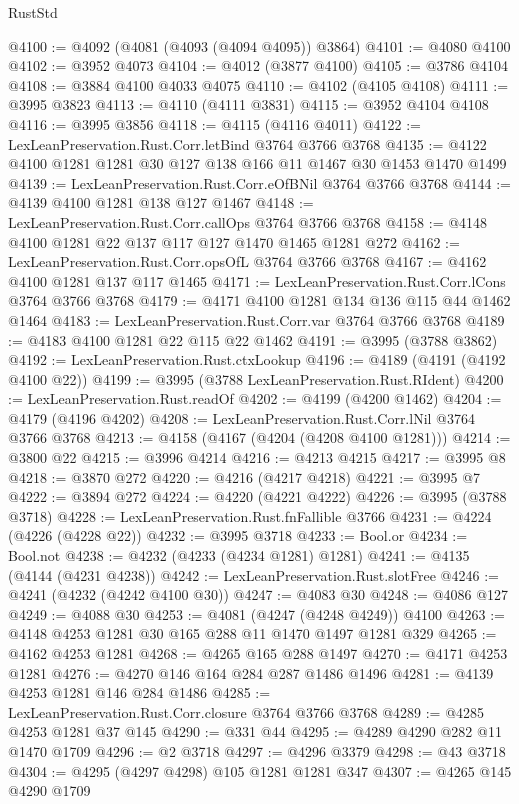 \begin{lexlean}{RustStd}
\begin{coremodule}
@4100 := @4092 (@4081 (@4093 (@4094 @4095)) @3864)
@4101 := @4080 @4100
@4102 := @3952 @4073
@4104 := @4012 (@3877 @4100)
@4105 := @3786 @4104
@4108 := @3884 @4100 @4033 @4075
@4110 := @4102 (@4105 @4108)
@4111 := @3995 @3823
@4113 := @4110 (@4111 @3831)
@4115 := @3952 @4104 @4108
@4116 := @3995 @3856
@4118 := @4115 (@4116 @4011)
@4122 := LexLeanPreservation.Rust.Corr.letBind @3764 @3766 @3768
@4135 := @4122 @4100 @1281 @1281 @30 @127 @138 @166 @11 @1467 @30 @1453 @1470 @1499
@4139 := LexLeanPreservation.Rust.Corr.eOfBNil @3764 @3766 @3768
@4144 := @4139 @4100 @1281 @138 @127 @1467
@4148 := LexLeanPreservation.Rust.Corr.callOps @3764 @3766 @3768
@4158 := @4148 @4100 @1281 @22 @137 @117 @127 @1470 @1465 @1281 @272
@4162 := LexLeanPreservation.Rust.Corr.opsOfL @3764 @3766 @3768
@4167 := @4162 @4100 @1281 @137 @117 @1465
@4171 := LexLeanPreservation.Rust.Corr.lCons @3764 @3766 @3768
@4179 := @4171 @4100 @1281 @134 @136 @115 @44 @1462 @1464
@4183 := LexLeanPreservation.Rust.Corr.var @3764 @3766 @3768
@4189 := @4183 @4100 @1281 @22 @115 @22 @1462
@4191 := @3995 (@3788 @3862)
@4192 := LexLeanPreservation.Rust.ctxLookup
@4196 := @4189 (@4191 (@4192 @4100 @22))
@4199 := @3995 (@3788 LexLeanPreservation.Rust.RIdent)
@4200 := LexLeanPreservation.Rust.readOf
@4202 := @4199 (@4200 @1462)
@4204 := @4179 (@4196 @4202)
@4208 := LexLeanPreservation.Rust.Corr.lNil @3764 @3766 @3768
@4213 := @4158 (@4167 (@4204 (@4208 @4100 @1281)))
@4214 := @3800 @22
@4215 := @3996 @4214
@4216 := @4213 @4215
@4217 := @3995 @8
@4218 := @3870 @272
@4220 := @4216 (@4217 @4218)
@4221 := @3995 @7
@4222 := @3894 @272
@4224 := @4220 (@4221 @4222)
@4226 := @3995 (@3788 @3718)
@4228 := LexLeanPreservation.Rust.fnFallible @3766
@4231 := @4224 (@4226 (@4228 @22))
@4232 := @3995 @3718
@4233 := Bool.or
@4234 := Bool.not
@4238 := @4232 (@4233 (@4234 @1281) @1281)
@4241 := @4135 (@4144 (@4231 @4238))
@4242 := LexLeanPreservation.Rust.slotFree
@4246 := @4241 (@4232 (@4242 @4100 @30))
@4247 := @4083 @30
@4248 := @4086 @127
@4249 := @4088 @30
@4253 := @4081 (@4247 (@4248 @4249)) @4100
@4263 := @4148 @4253 @1281 @30 @165 @288 @11 @1470 @1497 @1281 @329
@4265 := @4162 @4253 @1281
@4268 := @4265 @165 @288 @1497
@4270 := @4171 @4253 @1281
@4276 := @4270 @146 @164 @284 @287 @1486 @1496
@4281 := @4139 @4253 @1281 @146 @284 @1486
@4285 := LexLeanPreservation.Rust.Corr.closure @3764 @3766 @3768
@4289 := @4285 @4253 @1281 @37 @145
@4290 := @331 @44
@4295 := @4289 @4290 @282 @11 @1470 @1709
@4296 := @2 @3718
@4297 := @4296 @3379
@4298 := @43 @3718
@4304 := @4295 (@4297 @4298) @105 @1281 @1281 @347
@4307 := @4265 @145 @4290 @1709

\end{coremodule}
\end{lexlean}

